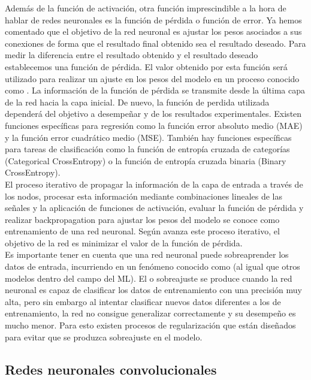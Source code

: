 Además de la función de activación, otra función imprescindible a la hora de hablar de redes neuronales es la función de pérdida o función de error. Ya hemos comentado que el objetivo de la red neuronal es ajustar los pesos asociados a sus conexiones de forma que el resultado final obtenido sea el resultado deseado. Para medir la diferencia entre el resultado obtenido y el resultado deseado establecemos una función de pérdida. El valor obtenido por esta función será utilizado para realizar un ajuste en los pesos del modelo en un proceso conocido como . La información de la función de pérdida se transmite desde la última capa de la red hacia la capa inicial. De nuevo, la función de perdida utilizada dependerá del objetivo a desempeñar y de los resultados experimentales. Existen funciones específicas para regresión como la función error absoluto medio (MAE) y la función error cuadrático medio (MSE). También hay funciones específicas para tareas de clasificación como la función de entropía cruzada de categorías (Categorical CrossEntropy) o la función de entropía cruzada binaria (Binary CrossEntropy).\\

El proceso iterativo de propagar la información de la capa de entrada a través de los nodos, procesar esta información mediante combinaciones lineales de las señales y la aplicación de funciones de activación, evaluar la función de pérdida y realizar backpropagation para ajustar los pesos del modelo se conoce como entrenamiento de una red neuronal. Según avanza este proceso iterativo, el objetivo de la red es minimizar el valor de la función de pérdida.\\

Es importante tener en cuenta que una red neuronal puede sobreaprender los datos de entrada, incurriendo en un fenómeno conocido como  (al igual que otros modelos dentro del campo del ML). El  o sobreajuste se produce cuando la red neuronal es capaz de clasificar los datos de entrenamiento con una precisión muy alta, pero sin embargo al intentar clasificar nuevos datos diferentes a los de entrenamiento, la red no consigue generalizar correctamente y su desempeño es mucho menor. Para esto existen procesos de regularización que están diseñados para evitar que se produzca sobreajuste en el modelo.

\subsection{Redes neuronales convolucionales}

